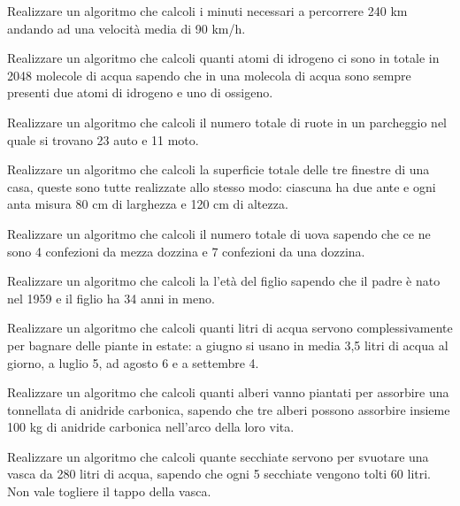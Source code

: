 \begin{exercise}
	Realizzare un algoritmo che calcoli i minuti necessari a percorrere 240 km andando ad una velocità media di 90 km/h.
\end{exercise}

\begin{exercise}
	Realizzare un algoritmo che calcoli quanti atomi di idrogeno ci sono in totale in 2048 molecole di acqua sapendo che in una molecola di acqua sono sempre presenti due atomi di idrogeno e uno di ossigeno.
\end{exercise}

\begin{exercise}
	Realizzare un algoritmo che calcoli il numero totale di ruote in un parcheggio nel quale si trovano 23 auto e 11 moto.
\end{exercise}

\begin{exercise}
	Realizzare un algoritmo che calcoli la superficie totale delle tre finestre di una casa, queste sono tutte realizzate allo stesso modo: ciascuna ha due ante e ogni anta misura 80 cm di larghezza e 120 cm di altezza.
\end{exercise}

\begin{exercise}
	Realizzare un algoritmo che calcoli il numero totale di uova sapendo che ce ne sono 4 confezioni da mezza dozzina e 7 confezioni da una dozzina.
\end{exercise}

\begin{exercise}
	Realizzare un algoritmo che calcoli la l'età del figlio sapendo che il padre è nato nel 1959 e il figlio ha 34 anni in meno.
\end{exercise}

\begin{exercise}
	Realizzare un algoritmo che calcoli quanti litri di acqua servono complessivamente per bagnare delle piante in estate: a giugno si usano in media 3,5 litri di acqua al giorno, a luglio 5, ad agosto 6 e a settembre 4.
\end{exercise}

\begin{exercise}
	Realizzare un algoritmo che calcoli quanti alberi vanno piantati per assorbire una tonnellata di anidride carbonica, sapendo che tre alberi possono assorbire insieme 100 kg di anidride carbonica nell'arco della loro vita.
\end{exercise}

\begin{exercise}
	Realizzare un algoritmo che calcoli quante secchiate servono per svuotare una vasca da 280 litri di acqua, sapendo che ogni 5 secchiate vengono tolti 60 litri. Non vale togliere il tappo della vasca.
\end{exercise}

